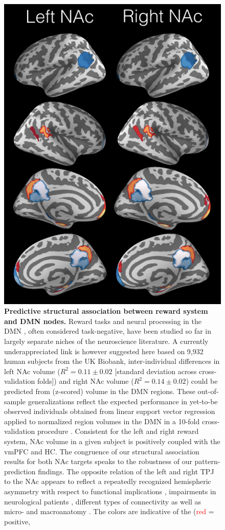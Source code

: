 \documentclass[10pt,letterpaper]{article}
\begin{document}
\begin{figure}[!htbp]
  
  \includegraphics[width=.75\linewidth]{fig_dmn.png}
  \caption{\textbf{Predictive structural association between reward system and
      DMN nodes.} Reward tasks \citep{doherty2015structure} and neural processing in the DMN \citep{randy2008}, often considered task-negative, have been studied so far in largely separate niches of the neuroscience literature. A currently underappreciated link is however suggested here based on 9,932 human subjects from the UK Biobank, inter-individual differences in left NAc volume ($R^2=0.11 \pm 0.02$ [standard deviation across cross-validation folds]) and right NAc volume ($R^2=0.14 \pm 0.02$) could be predicted from (z-scored) volume in the DMN regions. These out-of-sample generalizations reflect the expected performance in yet-to-be observed individuals obtained from linear support vector regression applied to normalized region volumes in the DMN in a 10-fold cross-validation procedure \citep{hastie}.
    Consistent for the left and right reward system, NAc volume in a given subject is
    positively coupled with the vmPFC and HC. The congruence of our structural association results for both NAc targets speaks to the robustness of our pattern-prediction findings. The opposite relation of the left and right TPJ to the NAc appears to reflect a repeatedly recognized hemispheric asymmetry with respect to functional implications \citep{seghier2013angular}, impairments in neurological patients \citep{corbetta2000}, different types of connectivity \citep{uddin_tpj, caspers2011} as well as micro- and macroanatomy \citep{caspers2006, caspers2008}. The colors are indicative of the (\textcolor{red}{red} = positive,
}
\end{figure}
\end{document}
